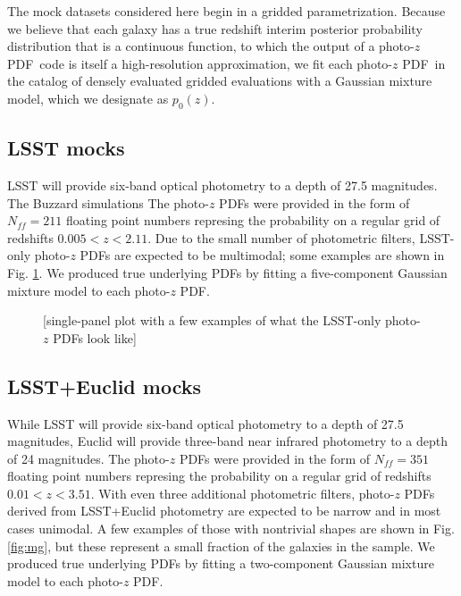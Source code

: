 \documentclass[\docopts]{\docclass}
\newcommand{\pz}{photo-$z$ PDF}
\begin{document}
The mock datasets considered here begin in a gridded parametrization.  Because 
we believe that each galaxy has a true redshift interim posterior probability 
distribution that is a continuous function, to which the output of a \pz\ code 
is itself a high-resolution approximation, we fit each \pz\ in the catalog of 
densely evaluated gridded evaluations with a Gaussian mixture model, which we 
designate as $p_{0}(z)$.

\subsection{LSST mocks}
\label{sec:ss}


LSST will provide six-band optical photometry to a depth of 27.5 magnitudes.  
  The Buzzard simulations The \pz s 
were provided in the form of $N_{ff}=211$ floating point numbers represing the 
probability on a regular grid of redshifts $0.005 < z < 2.11$.  Due to the 
small number of photometric filters, LSST-only \pz s are expected to be 
multimodal; some examples are shown in Fig. \ref{fig:ss}.  We produced true 
underlying PDFs by fitting a five-component Gaussian mixture model to each \pz.

\begin{figure}
  \caption{[single-panel plot with a few examples of what the LSST-only \pz s 
look like]
  \label{fig:ss}}
\end{figure}

\subsection{LSST+Euclid mocks}
\label{sec:mg}


While LSST will provide six-band optical photometry to a depth of 27.5 
magnitudes, Euclid will provide three-band near infrared photometry to a depth 
of 24 magnitudes.  The \pz s were provided in the form of $N_{ff}=351$ floating 
point numbers represing the probability on a regular grid of redshifts $0.01 < 
z < 3.51$.  With even three additional photometric filters, \pz s derived from 
LSST+Euclid photometry are expected to be narrow and in most cases unimodal.  A 
few examples of those with nontrivial shapes are shown in Fig. \ref{fig:mg}, 
but these represent a small fraction of the galaxies in the sample.  We 
produced true underlying PDFs by fitting a two-component Gaussian mixture model 
to each \pz.
\end{document}
